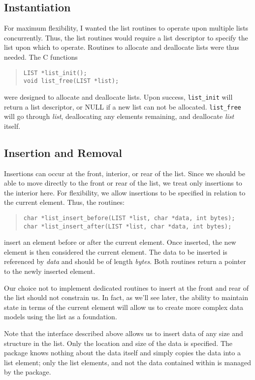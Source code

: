 \documentclass[fullpage,11pt]{article}
\begin{document}
\subsection{Instantiation}
For maximum flexibility, I wanted the list routines to operate upon multiple
lists concurrently.  Thus, the list routines would require a list descriptor
to specify the list upon which to operate.  Routines to allocate and
deallocate lists were thus needed.  The C functions
\begin{quote}
\begin{verbatim}
LIST *list_init();
void list_free(LIST *list);
\end{verbatim}
\end{quote}
were designed to allocate and deallocate lists.  Upon success,
{\tt list\_init} will return a list descriptor, or NULL if a new list can not
be allocated.  {\tt list\_free} will go through {\em list}, deallocating any
elements remaining,  and deallocate {\em list} itself.

\subsection{Insertion and Removal}
Insertions can occur at the front, interior, or rear of the list.  Since we
should be able to move directly to the front or rear of the list, we treat
only insertions to the interior here.  For flexibility, we allow insertions to
be specified in relation to the current element.  Thus, the routines:
\begin{quote}
\begin{verbatim}
char *list_insert_before(LIST *list, char *data, int bytes);
char *list_insert_after(LIST *list, char *data, int bytes);
\end{verbatim}
\end{quote}
insert an element before or after the current element.  Once inserted, the new
element is then considered the current element.  The data to be inserted is
referenced by {\em data} and should be of length {\em bytes}.  Both routines
return a pointer to the newly inserted element.

Our choice not to implement dedicated routines to insert at the front and rear
of the list should not constrain us.  In fact, as we'll see later, the ability
to maintain state in terms of the current element will allow us to create more
complex data models using the list as a foundation.

Note that the interface described above allows us to insert data of any size
and structure in the list.  Only the location and size of the data is
specified.  The package knows nothing about the data itself and simply copies
the data into a list element; only the list elements, and not the data
contained within is managed by the package.
\end{document}
